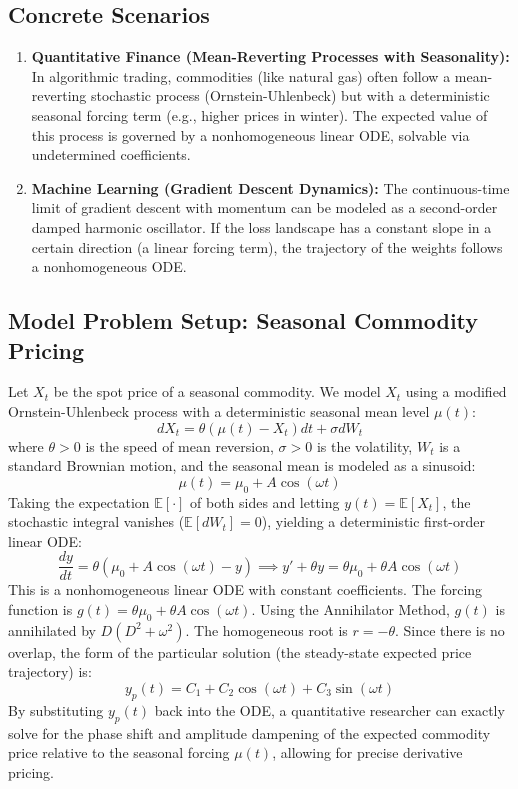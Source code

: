 \documentclass[11pt, a4paper]{article}
\theoremstyle{definition}
\theoremstyle{remark}
\newcommand{\E}{\mathbb{E}}
\begin{document}
\subsection{Concrete Scenarios}
\begin{enumerate}
    \item \textbf{Quantitative Finance (Mean-Reverting Processes with Seasonality):} In algorithmic trading, commodities (like natural gas) often follow a mean-reverting stochastic process (Ornstein-Uhlenbeck) but with a deterministic seasonal forcing term (e.g., higher prices in winter). The expected value of this process is governed by a nonhomogeneous linear ODE, solvable via undetermined coefficients.
    \item \textbf{Machine Learning (Gradient Descent Dynamics):} The continuous-time limit of gradient descent with momentum can be modeled as a second-order damped harmonic oscillator. If the loss landscape has a constant slope in a certain direction (a linear forcing term), the trajectory of the weights follows a nonhomogeneous ODE.
\end{enumerate}

\subsection{Model Problem Setup: Seasonal Commodity Pricing}
Let $X_t$ be the spot price of a seasonal commodity. We model $X_t$ using a modified Ornstein-Uhlenbeck process with a deterministic seasonal mean level $\mu(t)$:
\[
dX_t = \theta(\mu(t) - X_t)dt + \sigma dW_t
\]
where $\theta > 0$ is the speed of mean reversion, $\sigma > 0$ is the volatility, $W_t$ is a standard Brownian motion, and the seasonal mean is modeled as a sinusoid:
\[
\mu(t) = \mu_0 + A \cos(\omega t)
\]
Taking the expectation $\E[\cdot]$ of both sides and letting $y(t) = \E[X_t]$, the stochastic integral vanishes ($\E[dW_t] = 0$), yielding a deterministic first-order linear ODE:
\[
\frac{dy}{dt} = \theta(\mu_0 + A \cos(\omega t) - y) \implies y' + \theta y = \theta \mu_0 + \theta A \cos(\omega t)
\]
This is a nonhomogeneous linear ODE with constant coefficients. The forcing function is $g(t) = \theta \mu_0 + \theta A \cos(\omega t)$.
Using the Annihilator Method, $g(t)$ is annihilated by $D(D^2 + \omega^2)$. The homogeneous root is $r = -\theta$. Since there is no overlap, the form of the particular solution (the steady-state expected price trajectory) is:
\[
y_p(t) = C_1 + C_2 \cos(\omega t) + C_3 \sin(\omega t)
\]
By substituting $y_p(t)$ back into the ODE, a quantitative researcher can exactly solve for the phase shift and amplitude dampening of the expected commodity price relative to the seasonal forcing $\mu(t)$, allowing for precise derivative pricing.
\end{document}
